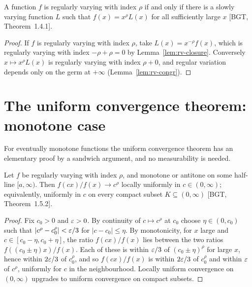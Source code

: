 \begin{theorem}
  \label{thm:rv-iff-exists-sv}
  \leanok
  A function $f$ is regularly varying with index $\rho$ if and only if there
  is a slowly varying function $L$ such that $f(x) = x^\rho L(x)$ for all
  sufficiently large $x$ [BGT, Theorem~1.4.1].
\end{theorem}
\begin{proof}
  \leanok
  If $f$ is regularly varying with index $\rho$, take $L(x) = x^{-\rho} f(x)$,
  which is regularly varying with index $-\rho + \rho = 0$ by
  Lemma~\ref{lem:rv-closure}. Conversely $x \mapsto x^\rho L(x)$ is regularly
  varying with index $\rho + 0$, and regular variation depends only on the germ
  at $+\infty$ (Lemma~\ref{lem:rv-congr}).
\end{proof}


\section{The uniform convergence theorem: monotone case}

For eventually monotone functions the uniform convergence theorem has an elementary
proof by a sandwich argument, and no measurability is needed.

\begin{theorem}
  \label{thm:rv-uct-monotone}
  \leanok
  Let $f$ be regularly varying with index $\rho$, and monotone or antitone on some
  half-line $[a, \infty)$. Then $f(cx)/f(x) \to c^\rho$ locally uniformly in
  $c \in (0, \infty)$; equivalently, uniformly in $c$ on every compact subset
  $K \subseteq (0,\infty)$ [BGT, Theorem~1.5.2].
\end{theorem}
\begin{proof}
  \leanok
  Fix $c_0 > 0$ and $\varepsilon > 0$. By continuity of $c \mapsto c^\rho$ at $c_0$ choose
  $\eta \in (0, c_0)$ such that $|c^\rho - c_0^\rho| < \varepsilon/3$ for $|c - c_0| \le \eta$.
  By monotonicity, for $x$ large and $c \in [c_0 - \eta, c_0 + \eta]$, the ratio
  $f(cx)/f(x)$ lies between the two ratios $f((c_0 \pm \eta)x)/f(x)$. Each of these
  is within $\varepsilon/3$ of $(c_0 \pm \eta)^\rho$ for large $x$, hence within $2\varepsilon/3$ of
  $c_0^\rho$, and so $f(cx)/f(x)$ is within $2\varepsilon/3$ of $c_0^\rho$ and within $\varepsilon$ of
  $c^\rho$, uniformly for $c$ in the neighbourhood. Locally uniform convergence on
  $(0,\infty)$ upgrades to uniform convergence on compact subsets.
\end{proof}

